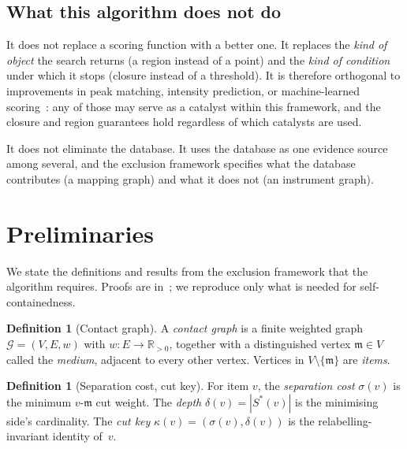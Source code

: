 \documentclass[11pt,a4paper]{article}
\theoremstyle{definition}
\newtheorem{definition}[theorem]{Definition}
\theoremstyle{remark}
\newcommand{\Gph}{\mathcal{G}}
\newcommand{\wt}{w}
\newcommand{\med}{\mathfrak{m}}
\newcommand{\sep}{\sigma}
\newcommand{\dep}{\delta}
\newcommand{\key}{\kappa}
\begin{document}
\subsection{What this algorithm does not do}

It does not replace a scoring function with a better one. It replaces
the \emph{kind of object} the search returns (a region instead of a
point) and the \emph{kind of condition} under which it stops (closure
instead of a threshold). It is therefore orthogonal to improvements in
peak matching, intensity prediction, or machine-learned
scoring~\citep{tran2017novo,zhou2017pdeep}: any of those may serve as a
catalyst within this framework, and the closure and region guarantees
hold regardless of which catalysts are used.

It does not eliminate the database. It uses the database as one evidence
source among several, and the exclusion framework specifies what the
database contributes (a mapping graph) and what it does not (an
instrument graph).

\section{Preliminaries}
\label{sec:prelim}

We state the definitions and results from the exclusion framework that
the algorithm requires. Proofs are
in~\citet{sachikonye2025peptide}; we reproduce only what is needed
for self-containedness.

\begin{definition}[Contact graph]
\label{def:contact}
A \emph{contact graph} is a finite weighted graph
$\Gph=(V,E,\wt)$ with $\wt:E\to\mathbb{R}_{>0}$, together with a
distinguished vertex $\med\in V$ called the \emph{medium}, adjacent to
every other vertex. Vertices in $V\setminus\{\med\}$ are \emph{items}.
\end{definition}

\begin{definition}[Separation cost, cut key]
\label{def:sep}
For item $v$, the \emph{separation cost} $\sep(v)$ is the minimum
$v$-$\med$ cut weight. The \emph{depth} $\dep(v)=|S^{\ast}(v)|$ is
the minimising side's cardinality. The \emph{cut key}
$\key(v)=(\sep(v),\dep(v))$ is the relabelling-invariant identity
of~$v$.
\end{definition}
\end{document}
